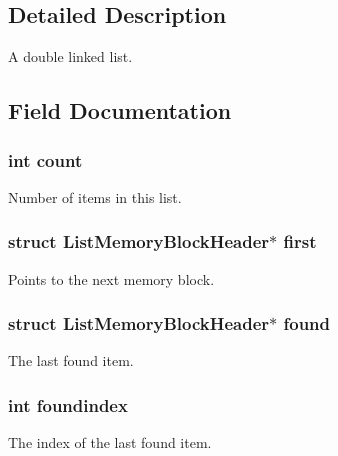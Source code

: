 \subsection{Detailed Description}
A double linked list. 

\subsection{Field Documentation}
\hypertarget{struct_list_ad43c3812e6d13e0518d9f8b8f463ffcf}{
\subsubsection[{count}]{\setlength{\rightskip}{0pt plus 5cm}int count}}\label{struct_list_ad43c3812e6d13e0518d9f8b8f463ffcf}


Number of items in this list. 

\hypertarget{struct_list_aad341c9d11e18ba0ff4abe71e916bf4c}{
\subsubsection[{first}]{\setlength{\rightskip}{0pt plus 5cm}struct {\bf List\-Memory\-Block\-Header}$\ast$ first}}\label{struct_list_aad341c9d11e18ba0ff4abe71e916bf4c}


Points to the next memory block. 

\hypertarget{struct_list_ad2024b5b87cb5f5fb344d1838c49b77f}{
\subsubsection[{found}]{\setlength{\rightskip}{0pt plus 5cm}struct {\bf List\-Memory\-Block\-Header}$\ast$ found}}\label{struct_list_ad2024b5b87cb5f5fb344d1838c49b77f}


The last found item. 

\hypertarget{struct_list_a6f582e298e6ce683da843212054a65bc}{
\subsubsection[{foundindex}]{\setlength{\rightskip}{0pt plus 5cm}int foundindex}}\label{struct_list_a6f582e298e6ce683da843212054a65bc}


The index of the last found item. 

